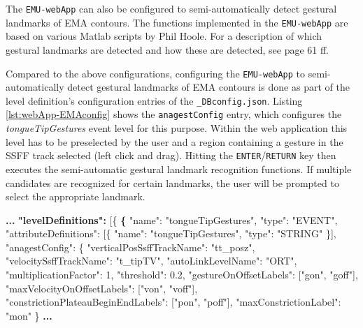 \documentclass[]{book}
\newenvironment{Shaded}{\begin{snugshade}}{\end{snugshade}}
\newcommand{\DataTypeTok}[1]{\textcolor[rgb]{0.13,0.29,0.53}{#1}}
\newcommand{\DecValTok}[1]{\textcolor[rgb]{0.00,0.00,0.81}{#1}}
\newcommand{\ErrorTok}[1]{\textcolor[rgb]{0.64,0.00,0.00}{\textbf{#1}}}
\newcommand{\FloatTok}[1]{\textcolor[rgb]{0.00,0.00,0.81}{#1}}
\newcommand{\FunctionTok}[1]{\textcolor[rgb]{0.00,0.00,0.00}{#1}}
\newcommand{\OtherTok}[1]{\textcolor[rgb]{0.56,0.35,0.01}{#1}}
\newcommand{\StringTok}[1]{\textcolor[rgb]{0.31,0.60,0.02}{#1}}
\begin{document}
The \texttt{EMU-webApp} can also be configured to semi-automatically detect gestural landmarks of EMA contours. The functions implemented in the \texttt{EMU-webApp} are based on various Matlab scripts by Phil Hoole. For a description of which gestural landmarks are detected and how these are detected, see \citet{bombien:2011aa} page 61 ff.

Compared to the above configurations, configuring the \texttt{EMU-webApp} to semi-automatically detect gestural landmarks of EMA contours is done as part of the level definition's configuration entries of the \texttt{\_DBconfig.json}. Listing \ref{lst:webApp-EMAconfig} shows the \texttt{anagestConfig} entry, which configures the \emph{tongueTipGestures} event level for this purpose. Within the web application this level has to be preselected by the user and a region containing a gesture in the SSFF track selected (left click and drag). Hitting the \texttt{ENTER}/\texttt{RETURN} key then executes the semi-automatic gestural landmark recognition functions. If multiple candidates are recognized for certain landmarks, the user will be prompted to select the appropriate landmark.

\begin{Shaded}
\begin{Highlighting}[]
\ErrorTok{...}
\ErrorTok{"levelDefinitions":} \OtherTok{[}\FunctionTok{\{}
  \ErrorTok{\{}
    \DataTypeTok{"name"}\FunctionTok{:} \StringTok{"tongueTipGestures"}\FunctionTok{,}
    \DataTypeTok{"type"}\FunctionTok{:} \StringTok{"EVENT"}\FunctionTok{,}
    \DataTypeTok{"attributeDefinitions"}\FunctionTok{:} \OtherTok{[}\FunctionTok{\{}
        \DataTypeTok{"name"}\FunctionTok{:} \StringTok{"tongueTipGestures"}\FunctionTok{,}
        \DataTypeTok{"type"}\FunctionTok{:} \StringTok{"STRING"}
    \FunctionTok{\}}\OtherTok{]}\FunctionTok{,}
    \DataTypeTok{"anagestConfig"}\FunctionTok{:} \FunctionTok{\{}
        \DataTypeTok{"verticalPosSsffTrackName"}\FunctionTok{:} \StringTok{"tt_posz"}\FunctionTok{,}
        \DataTypeTok{"velocitySsffTrackName"}\FunctionTok{:} \StringTok{"t_tipTV"}\FunctionTok{,}
        \DataTypeTok{"autoLinkLevelName"}\FunctionTok{:} \StringTok{"ORT"}\FunctionTok{,}
        \DataTypeTok{"multiplicationFactor"}\FunctionTok{:} \DecValTok{1}\FunctionTok{,}
        \DataTypeTok{"threshold"}\FunctionTok{:} \FloatTok{0.2}\FunctionTok{,}
        \DataTypeTok{"gestureOnOffsetLabels"}\FunctionTok{:} \OtherTok{[}\StringTok{"gon"}\OtherTok{,} \StringTok{"goff"}\OtherTok{]}\FunctionTok{,}
        \DataTypeTok{"maxVelocityOnOffsetLabels"}\FunctionTok{:} \OtherTok{[}\StringTok{"von"}\OtherTok{,} \StringTok{"voff"}\OtherTok{]}\FunctionTok{,}
        \DataTypeTok{"constrictionPlateauBeginEndLabels"}\FunctionTok{:} \OtherTok{[}\StringTok{"pon"}\OtherTok{,} \StringTok{"poff"}\OtherTok{]}\FunctionTok{,}
        \DataTypeTok{"maxConstrictionLabel"}\FunctionTok{:} \StringTok{"mon"}
    \FunctionTok{\}}
\ErrorTok{...}
\end{Highlighting}
\end{Shaded}
\end{document}
